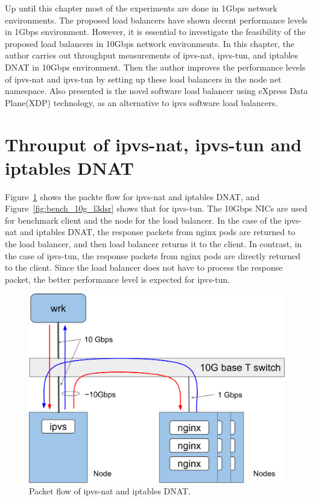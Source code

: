 Up until this chapter most of the experiments are done in 1Gbps network environments.
The proposed load balancers have shown decent performance levels in 1Gbps environment.
However, it is essential to investigate the feasibility of the proposed load balancers in 10Gbps network environments.
In this chapter, the author carries out throughput measurements of ipvs-nat, ipvs-tun, and iptables DNAT in 10Gbps environment.
Then the author improves the performance levels of ipvs-nat and ipvs-tun by setting up these load balancers in the node net namespace.
Also presented is the novel software load balancer using eXpress Data Plane(XDP) technology, as an alternative to ipvs software load balancers.

\section{Throuput of ipvs-nat, ipvs-tun and iptables DNAT}

Figure~\ref{fig:bench_10g} shows the packte flow for ipvs-nat and iptables DNAT, and Figure~\ref{fig:bench_10g_l3dsr} shows that for ipvs-tun.
The 10Gbps NICs are used for benchmark client and the node for the load balancer.
In the case of the ipvs-nat and iptables DNAT, the response packets from nginx pods are returned to the load balancer, and then load balancer returns it to the client.
In contrast, in the case of ipvs-tun, the response packets from nginx pods are directly returned to the client.
Since the load balancer does not have to process the response packet, the better performance level is expected for ipvs-tun.

\begin{figure}[h]
  \centering
  \includegraphics[width=0.8\columnwidth]{Figs/bench_10g}
  \caption{Packet flow of ipvs-nat and iptables DNAT.}
  \label{fig:bench_10g}
\end{figure}

